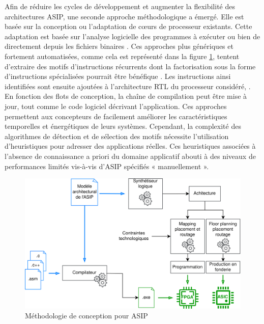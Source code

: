 \documentclass[../main.tex]{subfiles}
\begin{document}
Afin de réduire les cycles de développement et augmenter la flexibilité des architectures ASIP, une seconde approche méthodologique a émergé. Elle est basée sur la conception ou l’adaptation de cœurs de processeur existants. Cette adaptation est basée sur l'analyse logicielle des programmes à exécuter ou bien de directement depuis les fichiers binaires  \cite{PPB, PPC}. Ces approches plus génériques et fortement automatisées, comme cela est représenté dans la figure \ref{fig:methodo_asip}, tentent d’extraire des motifs d’instructions récurrents dont la factorisation sous la forme d’instructions spécialisées pourrait être bénéfique  \cite{phd_martin}. Les instructions ainsi identifiées sont ensuite ajoutées à l’architecture RTL du processeur considéré, \cite{NIOS:II}. En fonction des flots de conception, la chaîne de compilation peut être mise à jour, tout comme le code logiciel décrivant l’application. 
Ces approches permettent aux concepteurs de facilement améliorer les caractéristiques temporelles et énergétiques de leurs systèmes. Cependant, la complexité des algorithmes de détection et de sélection des motifs nécessite l’utilisation d’heuristiques pour adresser des applications réelles. Ces heuristiques associées à l’absence de connaissance a priori du domaine applicatif abouti à des niveaux de performances limités vis-à-vis d’ASIP spécifiés « manuellement ».

\begin{figure}[tb]
    \centering
    \includegraphics[scale=.15]{figs/methodo_asip.png}
    \caption{Méthodologie de conception pour ASIP}
    \label{fig:methodo_asip}
\end{figure}
\end{document}
